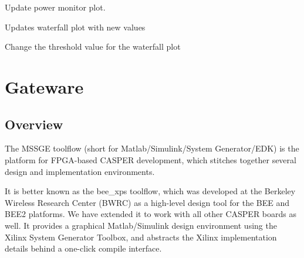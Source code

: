 \documentclass[letterpaper,10pt,english]{sphinxmanual}
\begin{document}
\begin{fulllineitems}
\begin{fulllineitems}
\label{software:hipsr_gui.HipsrGui.updateOverallPowerPlot}
Update power monitor plot.

\end{fulllineitems}


\begin{fulllineitems}
\label{software:hipsr_gui.HipsrGui.updateWaterfallPlot}
Updates waterfall plot with new values

\end{fulllineitems}


\begin{fulllineitems}
\label{software:hipsr_gui.HipsrGui.updateWaterfallThreshold}
Change the threshold value for the waterfall plot

\end{fulllineitems}


\end{fulllineitems}



\chapter{Gateware}
\label{gateware::doc}\label{gateware:gateware}

\section{Overview}
\label{gateware:overview}
The MSSGE toolflow (short for Matlab/Simulink/System Generator/EDK) is the platform
for FPGA-based CASPER development, which stitches together several design and implementation
environments.

It is better known as the bee\_xps toolflow, which was developed at the Berkeley Wireless
Research Center (BWRC) as a high-level design tool for the BEE and BEE2 platforms. We have
extended it to work with all other CASPER boards as well. It provides a graphical
Matlab/Simulink design environment using the Xilinx System Generator Toolbox,
and abstracts the Xilinx implementation details behind a one-click compile interface.
\end{document}

